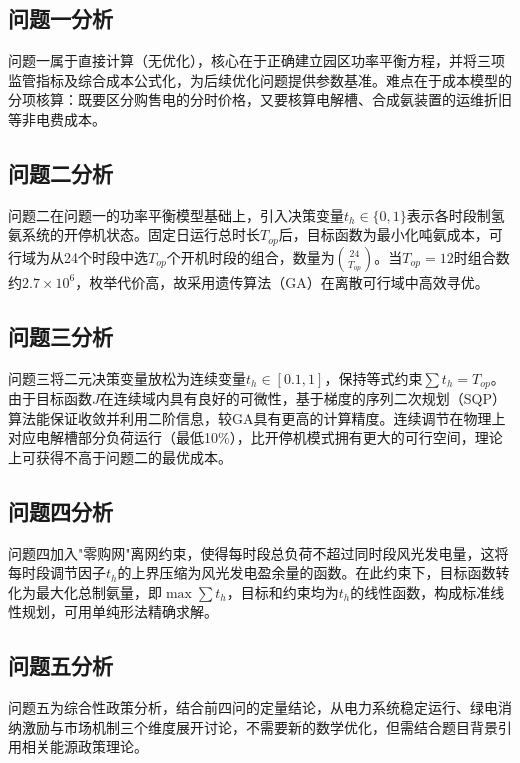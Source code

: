 \documentclass[UTF8,12pt,a4paper]{ctexart}
\begin{document}
\subsection{问题一分析}

问题一属于直接计算（无优化），核心在于正确建立园区功率平衡方程，并将三项监管指标及综合成本公式化，为后续优化问题提供参数基准。难点在于成本模型的分项核算：既要区分购售电的分时价格，又要核算电解槽、合成氨装置的运维折旧等非电费成本。

\subsection{问题二分析}

问题二在问题一的功率平衡模型基础上，引入决策变量$t_h\in\{0,1\}$表示各时段制氢氨系统的开停机状态。固定日运行总时长$T_{op}$后，目标函数为最小化吨氨成本，可行域为从24个时段中选$T_{op}$个开机时段的组合，数量为$\binom{24}{T_{op}}$。当$T_{op}=12$时组合数约$2.7\times10^6$，枚举代价高，故采用遗传算法（GA）在离散可行域中高效寻优。

\subsection{问题三分析}

问题三将二元决策变量放松为连续变量$t_h\in[0.1,1]$，保持等式约束$\sum t_h=T_{op}$。由于目标函数$J$在连续域内具有良好的可微性，基于梯度的序列二次规划（SQP）算法能保证收敛并利用二阶信息，较GA具有更高的计算精度。连续调节在物理上对应电解槽部分负荷运行（最低10\%），比开停机模式拥有更大的可行空间，理论上可获得不高于问题二的最优成本。

\subsection{问题四分析}

问题四加入"零购网"离网约束，使得每时段总负荷不超过同时段风光发电量，这将每时段调节因子$t_h$的上界压缩为风光发电盈余量的函数。在此约束下，目标函数转化为最大化总制氨量，即$\max\sum t_h$，目标和约束均为$t_h$的线性函数，构成标准线性规划，可用单纯形法精确求解。

\subsection{问题五分析}

问题五为综合性政策分析，结合前四问的定量结论，从电力系统稳定运行、绿电消纳激励与市场机制三个维度展开讨论，不需要新的数学优化，但需结合题目背景引用相关能源政策理论。
\end{document}
